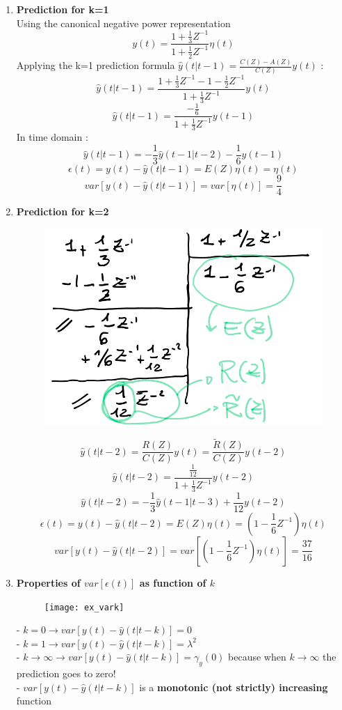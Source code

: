 \begin{enumerate}
\item \textbf{Prediction for k=1}\\
Using the canonical negative power representation $$ y(t) = \frac{1+\frac{1}{3}Z^{-1}}{1+\frac{1}{2}Z^{-1}}\eta(t)$$
Applying the k=1 prediction formula $ \hat{y}(t|t-1) = \frac{C(Z)-A(Z)}{C(Z)}y(t)$ :
$$ \hat{y}(t|t-1) = \frac{1+\frac{1}{3}Z^{-1}-1-\frac{1}{2}Z^{-1}}{1+\frac{1}{3}Z^{-1}}y(t)$$
$$ \hat{y}(t|t-1) = \frac{-\frac{1}{6}}{1+\frac{1}{3}Z^{-1}}y(t-1)$$
In time domain :
\[
\boxed{\hat{y}(t|t-1) = -\frac{1}{3}\hat{y}(t-1|t-2)-\frac{1}{6}y(t-1)}
\]
\[
\boxed{\epsilon(t) = y(t) - \hat{y}(t|t-1) = E(Z)\eta(t) = \eta(t)}
\]
\[
\boxed{var[ y(t) - \hat{y}(t|t-1)]= var[\eta(t)] = \frac{9}{4}}
\]
\newpage
\item \textbf{Prediction for k=2}
\begin{figure}[H]
 \centering
  \includegraphics[width=.5\linewidth]{ex_division}
\end{figure}
$$ \hat{y}(t|t-2) = \frac{R(Z)}{C(Z)}y(t) = \frac{\tilde{R}(Z)}{C(Z)}y(t-2)$$
$$ \hat{y}(t|t-2) = \frac{\frac{1}{12}}{1+\frac{1}{3}Z^{-1}}y(t-2)$$
\[
\boxed{\hat{y}(t|t-2) = -\frac{1}{3}\hat{y}(t-1|t-3) +\frac{1}{12}y(t-2)}
\]
\[
\boxed{\epsilon(t) = y(t) - \hat{y}(t|t-2) = E(Z)\eta(t) = (1-\frac{1}{6}Z^{-1})\eta(t)}
\]
\[
\boxed{var[ y(t) - \hat{y}(t|t-2)]= var[(1-\frac{1}{6}Z^{-1})\eta(t)] = \frac{37}{16}}
\]
\newpage
\item \textbf{Properties of $var[\epsilon(t)]$ as function of $k$}
\begin{figure}[H]
 \centering
  \texttt{[image: ex\_vark]}
\end{figure}
- $k=0 \to var[y(t) -\hat{y}(t|t-k)] = 0$\\
- $k=1 \to var[y(t) -\hat{y}(t|t-k)] = \lambda^2$\\
- $k \to \infty \to var[y(t) -\hat{y}(t|t-k)] = \gamma_y(0)$ because when $k \to \infty$ the prediction goes to zero!\\
- $ var[y(t) -\hat{y}(t|t-k)] $ is a \textbf{monotonic (not strictly) increasing} function


\end{enumerate}
